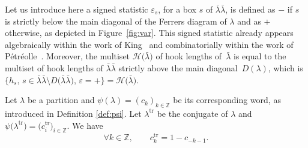 \documentclass[pdftex]{sigma}
\numberwithin{equation}{section}
\def\cch{\mathcal H}
\def\ccsc{\mathcal {SC}}
\def\ccdd{\mathcal {DD}}
\def\ccd{\mathcal {D}}
\newcommand{\Z}{\mathbb{Z}}
\begin{document}
Let us introduce here a signed statistic \textit{$\varepsilon_s$}, for a box $s$ of $\bar{\lambda}\bar{\lambda}$, is defined as $-$ if $s$ is strictly below the main diagonal of the Ferrers diagram of $\lambda$ and as $+$ otherwise, as depicted in Figure~\ref{fig:var}. This signed statistic already appears algebraically within the work of King~\cite{King} and combinatorially within the work of P\'etr\'eolle~\cite{MP}.
Moreover, the multiset $\cch\bigl(\bar{\lambda}\bigr)$ of hook lengths of~$\bar{\lambda}$ is equal to the multiset of hook lengths of $\bar{\lambda}\bar{\lambda}$ strictly above the main diagonal~$D(\lambda)$, which is~${\bigl\lbrace h_s,\, s\in\bar{\lambda}\bar{\lambda}\setminus D\bigl(\bar{\lambda}\bar{\lambda}\bigr),\,\varepsilon=+\bigr\rbrace=\cch\bigl(\bar{\lambda}\bigr)}$.

\begin{Remark}\label{rem:conju}
Let $\lambda$ be a partition and $\psi(\lambda)=(c_k)_{k\in\Z}$ be its corresponding word, as introduced in Definition \ref{def:psi}. Let $\lambda^{\mathrm{tr}}$ be the conjugate of $\lambda$ and $\psi\bigl(\lambda^{\mathrm{tr}}\bigr)=\bigl(c^{\mathrm{tr}}_i\bigr)_{i\in\Z}$. We have
\[\forall k\in\Z,\qquad
 c^{\mathrm{tr}}_k=1-c_{-k-1}.\]
\end{Remark}
\end{document}
